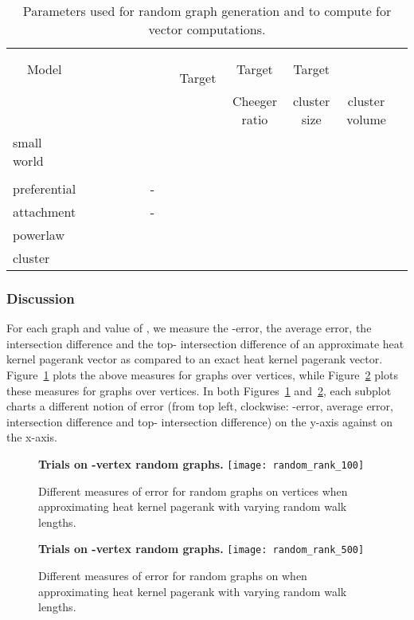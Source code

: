 \documentclass[runningheads,a4paper]{llncs}
\begin{document}
\begin{table}
\centering
\begin{tabular}{|p{2cm}|c|c|c|c|c|c|c|c|}
\hline
\multicolumn{1}{|c|}{Model} &  & ~~~~ & ~~~~ & ~~~~ 
Target & Target & Target & \\
 & & & & & Cheeger ratio & cluster size & cluster volume &\\
\hline\hline
small world  &  &  &  &  &  &  &  & \\
             &  &  &  &  &  &  &
 & \\\hline
preferential &  &  & - &  &  &  &  & \\
attachment   &  &  & - &  &  &  &
 & \\\hline
powerlaw     &  &  &  &  &  &  &  & \\
cluster      &  &  &  &  &  &  &
 & \\
\hline
\end{tabular}
\caption{Parameters used for random graph generation and to compute  for vector computations.}
\label{table:synthrankingparams} 
\end{table}

\subsubsection{Discussion} For each graph and value of , we measure the
-error, the average  error, the intersection difference and the
top- intersection difference of an approximate heat kernel pagerank vector
as compared to an exact heat kernel pagerank vector.
Figure~\ref{fig:random_rank_100} plots the above measures for graphs over
 vertices, while Figure~\ref{fig:random_rank_500} plots these measures
for graphs over  vertices.  In both Figures~\ref{fig:random_rank_100}
and~\ref{fig:random_rank_500}, each subplot charts a different notion of error
(from top left, clockwise: -error, average  error, intersection
difference and top- intersection difference) on the y-axis against  on
the x-axis.  

\begin{figure}
\centering
\textbf{Trials on -vertex random graphs.}
\texttt{[image: random\_rank\_100]}
\caption{Different measures of error for random graphs on  vertices when approximating heat
kernel pagerank with varying random walk lengths.}
\label{fig:random_rank_100}
\end{figure}

\begin{figure}
\centering
\textbf{Trials on -vertex random graphs.}
\texttt{[image: random\_rank\_500]}
\caption{Different measures of error for random graphs on  when approximating heat
kernel pagerank with varying random walk lengths.}
\label{fig:random_rank_500}
\end{figure}
\end{document}
